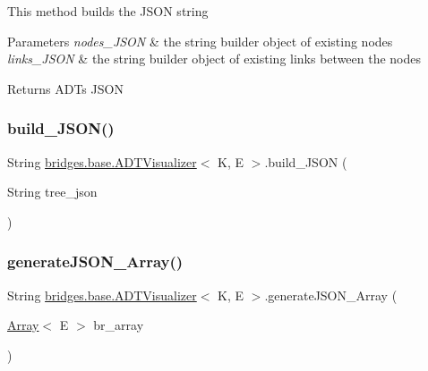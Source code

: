 This method builds the J\+S\+ON string 
\begin{DoxyParams}{Parameters}
{\em nodes\+\_\+\+J\+S\+ON} & the string builder object of existing nodes \\
\hline
{\em links\+\_\+\+J\+S\+ON} & the string builder object of existing links between the nodes \\
\hline
\end{DoxyParams}
\begin{DoxyReturn}{Returns}
A\+DT\textquotesingle{}s J\+S\+ON 
\end{DoxyReturn}
\hypertarget{classbridges_1_1base_1_1_a_d_t_visualizer_a520eef21260f327101b7e013f9814c45}{}\label{classbridges_1_1base_1_1_a_d_t_visualizer_a520eef21260f327101b7e013f9814c45} 
\subsubsection{\texorpdfstring{build\+\_\+\+J\+S\+O\+N()}{build\_JSON()}\hspace{0.1cm}{\footnotesize\ttfamily [2/2]}}
{\footnotesize\ttfamily String \hyperlink{classbridges_1_1base_1_1_a_d_t_visualizer}{bridges.\+base.\+A\+D\+T\+Visualizer}$<$ K, E $>$.build\+\_\+\+J\+S\+ON (\begin{DoxyParamCaption}\item[{String}]{tree\+\_\+json }\end{DoxyParamCaption})}

\hypertarget{classbridges_1_1base_1_1_a_d_t_visualizer_a1f37c20302432878a91c03544b81cc27}{}\label{classbridges_1_1base_1_1_a_d_t_visualizer_a1f37c20302432878a91c03544b81cc27} 
\subsubsection{\texorpdfstring{generate\+J\+S\+O\+N\+\_\+\+Array()}{generateJSON\_Array()}\hspace{0.1cm}{\footnotesize\ttfamily [1/2]}}
{\footnotesize\ttfamily String \hyperlink{classbridges_1_1base_1_1_a_d_t_visualizer}{bridges.\+base.\+A\+D\+T\+Visualizer}$<$ K, E $>$.generate\+J\+S\+O\+N\+\_\+\+Array (\begin{DoxyParamCaption}\item[{\hyperlink{classbridges_1_1base_1_1_array}{Array}$<$ E $>$}]{br\+\_\+array }\end{DoxyParamCaption})}

